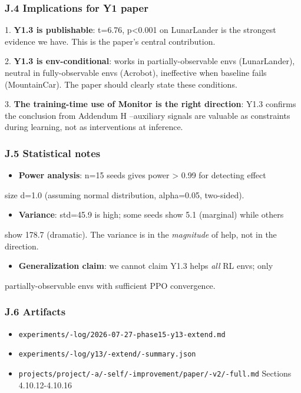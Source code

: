 \documentclass[11pt]{article}
\begin{document}
\subsubsection{J.4 Implications for Y1 paper}

1. \textbf{Y1.3 is publishable}: t=6.76, p<0.001 on LunarLander is the strongest
   evidence we have. This is the paper's central contribution.

2. \textbf{Y1.3 is env-conditional}: works in partially-observable envs (LunarLander),
   neutral in fully-observable envs (Acrobot), ineffective when baseline fails
   (MountainCar). The paper should clearly state these conditions.

3. \textbf{The training-time use of Monitor is the right direction}: Y1.3 confirms
   the conclusion from Addendum H --auxiliary signals are valuable as
   constraints during learning, not as interventions at inference.

\subsubsection{J.5 Statistical notes}

\begin{itemize}
  \item \textbf{Power analysis}: n=15 seeds gives power > 0.99 for detecting effect
\end{itemize}

  size d=1.0 (assuming normal distribution, alpha=0.05, two-sided).
\begin{itemize}
  \item \textbf{Variance}: std=45.9 is high; some seeds show 5.1 (marginal) while others
\end{itemize}

  show 178.7 (dramatic). The variance is in the \textit{magnitude} of help, not
  in the direction.
\begin{itemize}
  \item \textbf{Generalization claim}: we cannot claim Y1.3 helps \textit{all} RL envs; only
\end{itemize}

  partially-observable envs with sufficient PPO convergence.

\subsubsection{J.6 Artifacts}

\begin{itemize}
  \item \texttt{experiments/-log/2026-07-27-phase15-y13-extend.md}
  \item \texttt{experiments/-log/y13/-extend/-summary.json}
  \item \texttt{projects/project/-a/-self/-improvement/paper/-v2/-full.md} Sections 4.10.12-4.10.16
\end{itemize}
\end{document}
